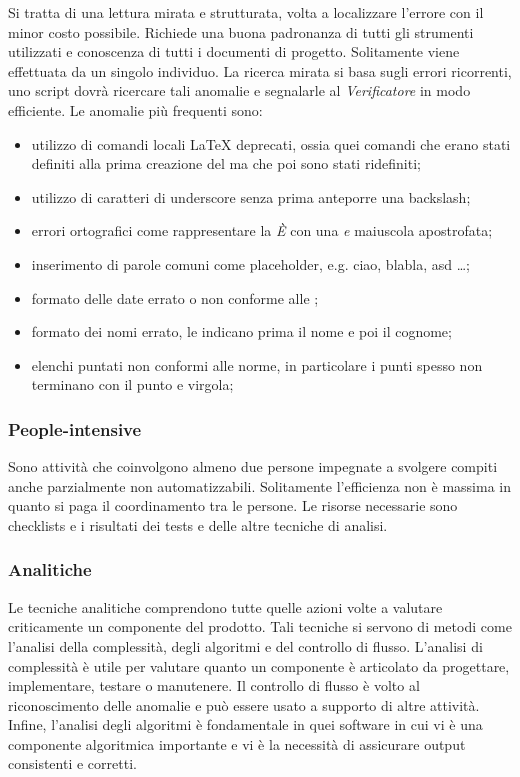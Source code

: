			Si tratta di una lettura mirata e strutturata, volta a localizzare l'errore con il minor costo possibile. Richiede una buona padronanza di tutti gli strumenti utilizzati e conoscenza di tutti i documenti di progetto. Solitamente viene effettuata da un singolo individuo. La ricerca mirata si basa sugli errori ricorrenti, uno script dovrà ricercare tali anomalie e segnalarle al \emph{Verificatore} in modo efficiente.
			Le anomalie più frequenti sono:
			\begin{itemize}
				\item utilizzo di comandi locali \LaTeX{} deprecati, ossia quei comandi che erano stati definiti alla prima creazione del  ma che poi sono stati ridefiniti;
				\item utilizzo di caratteri di underscore senza prima anteporre una backslash;
				\item errori ortografici come rappresentare la \emph{È} con una \emph{e} maiuscola apostrofata;
				\item inserimento di parole comuni come placeholder, e.g. ciao, blabla, asd \dots;
				\item formato delle date errato o non conforme alle \NormeDiProgetto{};
				\item formato dei nomi errato, le \NormeDiProgetto{} indicano prima il nome e poi il cognome;
				\item elenchi puntati non conformi alle norme, in particolare i punti spesso non terminano con il punto e virgola;
				

			\end{itemize}
			
			
		\subsubsection{People-intensive}

		Sono attività che coinvolgono almeno due persone impegnate a svolgere compiti anche parzialmente non automatizzabili. Solitamente l'efficienza non è massima in quanto si paga il coordinamento tra le persone. Le risorse necessarie sono checklists e i risultati dei tests e delle altre tecniche di analisi.
	
		\subsubsection{Analitiche}

		Le tecniche analitiche comprendono tutte quelle azioni volte a valutare criticamente un componente del prodotto. Tali tecniche si servono di metodi come l'analisi della complessità, degli algoritmi e del controllo di flusso. L'analisi di complessità è utile per valutare quanto un componente è articolato da progettare, implementare, testare o manutenere. Il controllo di flusso è volto al riconoscimento delle anomalie e può essere usato a supporto di altre attività. Infine, l'analisi degli algoritmi è fondamentale in quei software in cui vi è una componente algoritmica importante e vi è la necessità di assicurare output consistenti e corretti. 
				
